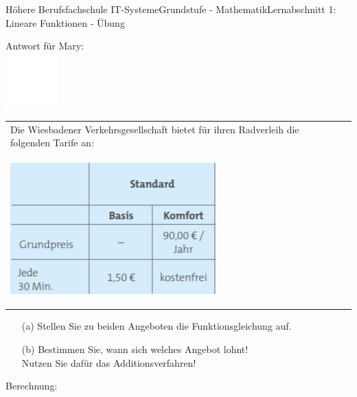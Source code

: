 \documentclass[oneside,openany,headings=optiontotoc,11pt,numbers=noenddot]{scrreprt}
\begin{document}
\begin{worksheet}{Höhere Berufsfachschule IT-Systeme}{Grundstufe - Mathematik}{Lernabschnitt 1: Lineare Funktionen - Übung}
\begin{framed}
		\end{framed}
		\begin{framed}
			\noindent
			\small{\color{codegray}Antwort für Mary:}\\
			\includegraphics[width=0.15\textwidth]{../../empty.jpg}\\
		\end{framed}
		\normalsize
		\newpage
		\begin{framed}
			\noindent
			\begin{tabularx}{\textwidth}{Xr}
				Die Wiesbadener Verkehrsgesellschaft bietet für ihren Radverleih die folgenden Tarife an:\\
				\begin{centering}
					\includegraphics{../99_Bilder/eswe.png}
				\end{centering}
			\end{tabularx}
			\begin{itemize}
				\item[(a)] Stellen Sie zu beiden Angeboten die Funktionsgleichung auf.
				\item[(b)] Bestimmen Sie, wann sich welches Angebot lohnt!\\
				\small{Nutzen Sie dafür das Additionsverfahren!}
			\end{itemize}
		\end{framed}
		\begin{framed}
			\noindent
			\small{\color{codegray}Berechnung:}\\

\end{framed}
\end{worksheet}
\end{document}
